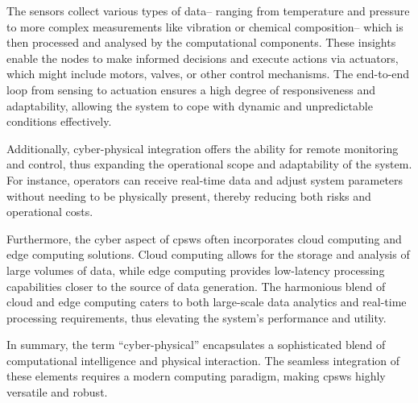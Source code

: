 The sensors collect various types of data--
 ranging from temperature and pressure to more complex measurements like vibration or chemical composition--
 which is then processed and analysed by the computational components. 
 These insights enable the nodes to make informed decisions and execute actions via actuators, 
 which might include motors, valves, or other control mechanisms. 
 The end-to-end loop from sensing to actuation ensures a high degree of responsiveness and adaptability,
 allowing the system to cope with dynamic and unpredictable conditions effectively.

Additionally, cyber-physical integration offers the ability for remote monitoring and control, 
 thus expanding the operational scope and adaptability of the system. 
 For instance, operators can receive real-time data and adjust system parameters without needing to be physically present, 
 thereby reducing both risks and operational costs.

Furthermore, the cyber aspect of \acp{cpsw} often incorporates cloud computing and edge computing solutions. 
 Cloud computing allows for the storage and analysis of large volumes of data, while edge computing provides low-latency processing capabilities closer to the source of data generation. 
 The harmonious blend of cloud and edge computing caters to both large-scale data analytics and real-time processing requirements, thus elevating the system's performance and utility.

In summary, the term ``cyber-physical'' encapsulates a sophisticated blend of computational intelligence and physical interaction. 
 The seamless integration of these elements requires a modern computing paradigm, making \acp{cpsw} highly versatile and robust.

